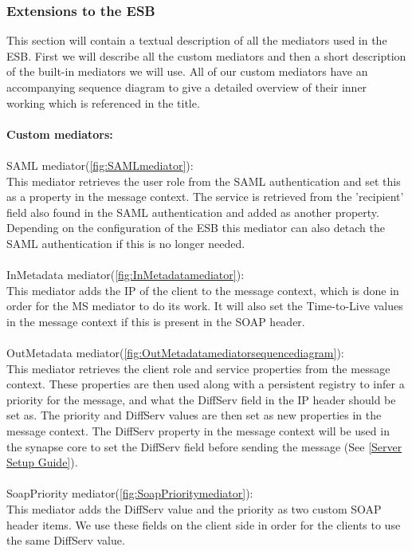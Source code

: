     \subsubsection{Extensions to the ESB}\label{Extensions to the ESB} 
    This section will contain a textual description of all the mediators used in the ESB. First we will describe all the custom mediators and then a short description of the built-in mediators we will use. All of our custom mediators have an accompanying sequence diagram to give a detailed overview of their inner working which is referenced in the title.
\\\\
\textbf{Custom mediators:}\\\\
SAML mediator(\ref{fig:SAMLmediator}):\\
    This mediator retrieves the user role from the SAML authentication and set this as a property in the message context. The service is retrieved from the 'recipient' field also found in the SAML authentication and added as another property. Depending on the configuration of the ESB this mediator can also detach the SAML authentication if this is no longer needed.
\\\\
InMetadata mediator(\ref{fig:InMetadatamediator}):\\
	This mediator adds the IP of the client to the message context, which is done in order for the MS mediator to do its work. It will also set the Time-to-Live values in the message context if this is present in the SOAP header.
\\\\
OutMetadata mediator(\ref{fig:OutMetadatamediatorsequencediagram}):\\
    This mediator retrieves the client role and service properties from the message context. These properties are then used along with a persistent registry to infer a priority for the message, and what the DiffServ field in the IP header should be set as. The priority and DiffServ values are then set as new properties in the message context.
    The DiffServ property in the message context will be used in the synapse core to set the DiffServ field before sending the message (See \ref{Server Setup Guide}).
\\\\
SoapPriority mediator(\ref{fig:SoapPrioritymediator}):\\
	This mediator adds the DiffServ value and the priority as two custom SOAP header items. We use these fields on the client side in order for the clients to use the same DiffServ value.
